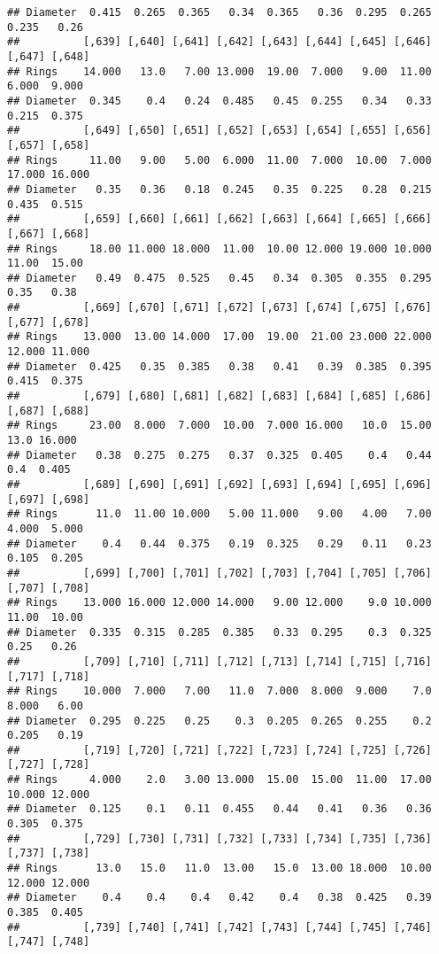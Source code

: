 \documentclass[
]{article}
\begin{document}
\begin{verbatim}
## Diameter  0.415  0.265  0.365   0.34  0.365   0.36  0.295  0.265  0.235   0.26
##          [,639] [,640] [,641] [,642] [,643] [,644] [,645] [,646] [,647] [,648]
## Rings    14.000   13.0   7.00 13.000  19.00  7.000   9.00  11.00  6.000  9.000
## Diameter  0.345    0.4   0.24  0.485   0.45  0.255   0.34   0.33  0.215  0.375
##          [,649] [,650] [,651] [,652] [,653] [,654] [,655] [,656] [,657] [,658]
## Rings     11.00   9.00   5.00  6.000  11.00  7.000  10.00  7.000 17.000 16.000
## Diameter   0.35   0.36   0.18  0.245   0.35  0.225   0.28  0.215  0.435  0.515
##          [,659] [,660] [,661] [,662] [,663] [,664] [,665] [,666] [,667] [,668]
## Rings     18.00 11.000 18.000  11.00  10.00 12.000 19.000 10.000  11.00  15.00
## Diameter   0.49  0.475  0.525   0.45   0.34  0.305  0.355  0.295   0.35   0.38
##          [,669] [,670] [,671] [,672] [,673] [,674] [,675] [,676] [,677] [,678]
## Rings    13.000  13.00 14.000  17.00  19.00  21.00 23.000 22.000 12.000 11.000
## Diameter  0.425   0.35  0.385   0.38   0.41   0.39  0.385  0.395  0.415  0.375
##          [,679] [,680] [,681] [,682] [,683] [,684] [,685] [,686] [,687] [,688]
## Rings     23.00  8.000  7.000  10.00  7.000 16.000   10.0  15.00   13.0 16.000
## Diameter   0.38  0.275  0.275   0.37  0.325  0.405    0.4   0.44    0.4  0.405
##          [,689] [,690] [,691] [,692] [,693] [,694] [,695] [,696] [,697] [,698]
## Rings      11.0  11.00 10.000   5.00 11.000   9.00   4.00   7.00  4.000  5.000
## Diameter    0.4   0.44  0.375   0.19  0.325   0.29   0.11   0.23  0.105  0.205
##          [,699] [,700] [,701] [,702] [,703] [,704] [,705] [,706] [,707] [,708]
## Rings    13.000 16.000 12.000 14.000   9.00 12.000    9.0 10.000  11.00  10.00
## Diameter  0.335  0.315  0.285  0.385   0.33  0.295    0.3  0.325   0.25   0.26
##          [,709] [,710] [,711] [,712] [,713] [,714] [,715] [,716] [,717] [,718]
## Rings    10.000  7.000   7.00   11.0  7.000  8.000  9.000    7.0  8.000   6.00
## Diameter  0.295  0.225   0.25    0.3  0.205  0.265  0.255    0.2  0.205   0.19
##          [,719] [,720] [,721] [,722] [,723] [,724] [,725] [,726] [,727] [,728]
## Rings     4.000    2.0   3.00 13.000  15.00  15.00  11.00  17.00 10.000 12.000
## Diameter  0.125    0.1   0.11  0.455   0.44   0.41   0.36   0.36  0.305  0.375
##          [,729] [,730] [,731] [,732] [,733] [,734] [,735] [,736] [,737] [,738]
## Rings      13.0   15.0   11.0  13.00   15.0  13.00 18.000  10.00 12.000 12.000
## Diameter    0.4    0.4    0.4   0.42    0.4   0.38  0.425   0.39  0.385  0.405
##          [,739] [,740] [,741] [,742] [,743] [,744] [,745] [,746] [,747] [,748]

\end{verbatim}
\end{document}

